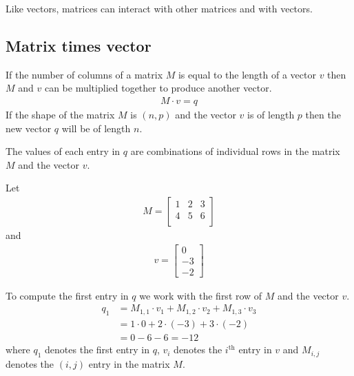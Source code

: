 Like vectors, matrices can interact with other matrices and with vectors. 

\subsection{Matrix times vector}

If the number of columns of a matrix $M$ is equal to the length of a vector $v$ then $M$ and $v$ can be multiplied together to produce another vector.
\begin{align}
    M \cdot v=q
\end{align}
If the shape of the matrix $M$ is $(n,p)$ and the vector $v$ is of length $p$ then the new vector $q$ will be of length $n$.

The values of each entry in $q$ are combinations of individual rows in the matrix $M$ and the vector $v$. 

Let 
\begin{align}
    M = \begin{bmatrix}
         1 & 2 & 3 \\
         4 & 5 & 6 \\
        \end{bmatrix}
\end{align}
and 
\begin{align}
    v = \begin{bmatrix}
           0\\
           -3\\
           -2
        \end{bmatrix}
\end{align}

To compute the first entry in $q$ we work with the first row of $M$ and the vector $v$.
\begin{align}
    q_{1} &= M_{1,1} \cdot v_{1} + M_{1,2} \cdot v_{2} + M_{1,3} \cdot v_{3} \\  
          &= 1 \cdot 0 + 2 \cdot (-3) + 3 \cdot (-2)\\
          &= 0 -6 -6 = -12
\end{align}
where $q_{1}$ denotes the first entry in $q$, $v_{i}$ denotes the $i^{\text{th}}$ entry in $v$ and $M_{i,j}$ denotes the $(i,j)$ entry in the matrix $M$.

